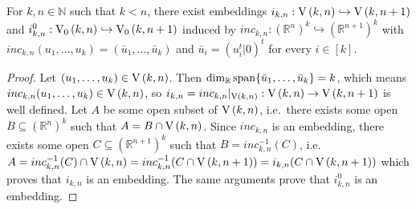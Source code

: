 \begin{lemma} For $k,n\in\mathbb{N}$ such that $k<n$, there exist embeddings $i_{k,n}:\St{k}{n}\hookrightarrow\St{k}{n+1}$ and $i^0_{k,n}:\StO{k}{n}\hookrightarrow\StO{k}{n+1}$ induced by $inc_{k,n}:(\mathbb{R}^n)^k\hookrightarrow(\mathbb{R}^{n+1})^k$ with $inc_{k,n}(u_1,\ldots,u_k)=(\bar{u}_1,\ldots,\bar{u}_k)$ and $\bar{u}_i=(u_i^t|0)^t$ for every $i\in[k]$.
\end{lemma}
\begin{proof} Let $(u_1,\ldots,u_k)\in\St{k}{n}$. Then $\dim_{\mathbb{R}}\mathrm{span}\{\bar{u}_1,\ldots,\bar{u}_k\}=k$, which means $inc_{k,n}(u_1,\ldots,u_k)\in\St{k}{n}$, so $i_{k,n}=inc_{k,n}|_{\St{k}{n}}:\St{k}{n}\to\St{k}{n+1}$ is well defined. Let $A$ be some open subset of $\St{k}{n}$, i.e.\ there exists some open $B\subseteq(\mathbb{R}^n)^k$ such that $A=B\cap\St{k}{n}$. Since $inc_{k,n}$ is an embedding, there exists some open $C\subseteq(\mathbb{R}^{n+1})^k$ such that $B=inc_{k,n}^{-1}(C)$, i.e.\ $A=inc_{k,n}^{-1}(C)\cap\St{k}{n}=inc_{k,n}^{-1}(C\cap\St{k}{n+1})=i_{k,n}(C\cap\St{k}{n+1})$ which proves that $i_{k,n}$ is an embedding. The same arguments prove that $i_{k,n}^0$ is an embedding.
\end{proof}

